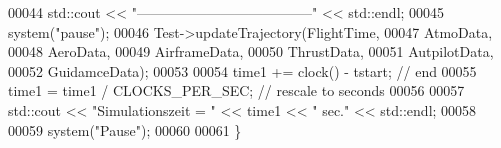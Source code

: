 \begin{DoxyCode}
00044         std::cout << \textcolor{stringliteral}{"--------------------------------------"} << std::endl;
00045         system(\textcolor{stringliteral}{"pause"});
00046         Test->updateTrajectory(FlightTime,
00047                                 AtmoData,
00048                                 AeroData,
00049                                 AirframeData,
00050                                 ThrustData, 
00051                                 AutpilotData,
00052                                 GuidamceData);
00053 
00054     time1 += clock() - tstart;     \textcolor{comment}{// end}
00055     time1 = time1 / CLOCKS\_PER\_SEC;  \textcolor{comment}{// rescale to seconds}
00056 
00057     std::cout << \textcolor{stringliteral}{"Simulationszeit = "} << time1 << \textcolor{stringliteral}{" sec."} << std::endl;
00058 
00059     system(\textcolor{stringliteral}{"Pause"});
00060 
00061 \}
\end{DoxyCode}
